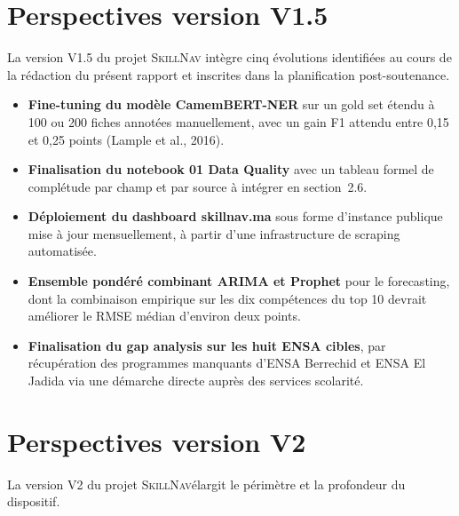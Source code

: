 \documentclass[11pt,a4paper,openany]{report}
\newcommand{\skillnav}{\textsc{SkillNav}\xspace}
\begin{document}
\section{Perspectives version V1.5}

La version V1.5 du projet \skillnav int\`egre cinq \'evolutions identifi\'ees au cours de la r\'edaction du pr\'esent rapport et inscrites dans la planification post-soutenance.

\begin{itemize}
  \item \textbf{Fine-tuning du mod\`ele CamemBERT-NER} sur un gold set \'etendu \`a 100 ou 200 fiches annot\'ees manuellement, avec un gain F1 attendu entre 0,15 et 0,25 points (Lample et al., 2016).
  \item \textbf{Finalisation du notebook 01 Data Quality} avec un tableau formel de compl\'etude par champ et par source \`a int\'egrer en section~2.6.
  \item \textbf{D\'eploiement du dashboard skillnav.ma} sous forme d'instance publique mise \`a jour mensuellement, \`a partir d'une infrastructure de scraping automatis\'ee.
  \item \textbf{Ensemble pond\'er\'e combinant ARIMA et Prophet} pour le forecasting, dont la combinaison empirique sur les dix comp\'etences du top 10 devrait am\'eliorer le RMSE m\'edian d'environ deux points.
  \item \textbf{Finalisation du gap analysis sur les huit ENSA cibles}, par r\'ecup\'eration des programmes manquants d'ENSA Berrechid et ENSA El Jadida via une d\'emarche directe aupr\`es des services scolarit\'e.
\end{itemize}

\section{Perspectives version V2}

La version V2 du projet \skillnav \'elargit le p\'erim\`etre et la profondeur du dispositif.
\end{document}
